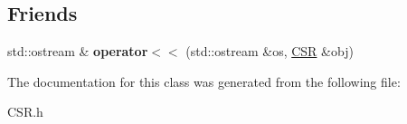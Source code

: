\subsection*{Friends}
\begin{DoxyCompactItemize}
\item 
\mbox{\label{classCSR_ae4221e892ee951b6b5a7a65ae6421596}} 
std\+::ostream \& {\bfseries operator$<$$<$} (std\+::ostream \&os, \mbox{\hyperlink{classCSR}{C\+SR}} \&obj)
\end{DoxyCompactItemize}


The documentation for this class was generated from the following file\+:\begin{DoxyCompactItemize}
\item 
C\+S\+R.\+h\end{DoxyCompactItemize}
